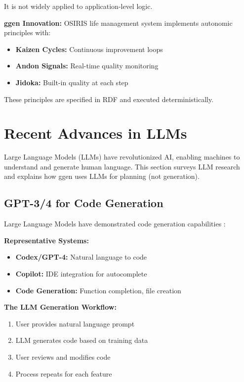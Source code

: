 It is not widely applied to application-level logic.

\textbf{ggen Innovation:} OSIRIS life management system implements autonomic principles with:
\begin{itemize}
    \item \textbf{Kaizen Cycles:} Continuous improvement loops
    \item \textbf{Andon Signals:} Real-time quality monitoring
    \item \textbf{Jidoka:} Built-in quality at each step
\end{itemize}

These principles are specified in RDF and executed deterministically.

\section{Recent Advances in LLMs}

Large Language Models (LLMs) have revolutionized AI, enabling machines to understand and generate human language. This section surveys LLM research and explains how ggen uses LLMs for planning (not generation).

\subsection{GPT-3/4 for Code Generation}

Large Language Models have demonstrated code generation capabilities \cite{chen2021evaluating, openai2023gpt4}:

\textbf{Representative Systems:}
\begin{itemize}
    \item \textbf{Codex/GPT-4:} Natural language to code
    \item \textbf{Copilot:} IDE integration for autocomplete
    \item \textbf{Code Generation:} Function completion, file creation
\end{itemize}

\textbf{The LLM Generation Workflow:}
\begin{enumerate}
    \item User provides natural language prompt
    \item LLM generates code based on training data
    \item User reviews and modifies code
    \item Process repeats for each feature
\end{enumerate}

